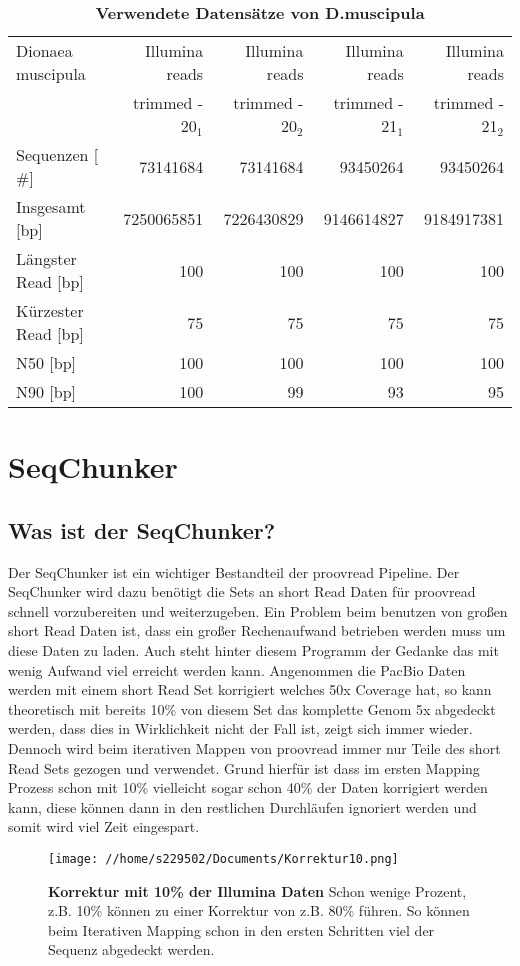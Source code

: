 \documentclass{scrartcl}
\begin{document}
\begin{table}[!ht]
\caption[Verwendete Datensätze von D.muscipula]{\textbf{Verwendete Datensätze von D.muscipula}}
\begin{center}
\begin{tabular}{lrrrr}
Dionaea muscipula & Illumina reads & Illumina reads & Illumina reads & Illumina reads\\
 & trimmed - 20$_{\text{1}}$ & trimmed - 20$_{\text{2}}$ & trimmed - 21$_{\text{1}}$ & trimmed - 21$_{\text{2}}$\\
\hline
Sequenzen        [ \#] & 73141684 & 73141684 & 93450264 & 93450264\\
Insgesamt        [bp] & 7250065851 & 7226430829 & 9146614827 & 9184917381\\
Längster Read    [bp] & 100 & 100 & 100 & 100\\
Kürzester Read   [bp] & 75 & 75 & 75 & 75\\
N50              [bp] & 100 & 100 & 100 & 100\\
N90              [bp] & 100 & 99 & 93 & 95\\
\end{tabular}
\end{center}
\end{table}
\clearpage

\section{SeqChunker}
\label{sec-5}
\subsection{Was ist der SeqChunker?}
\label{sec-5-1}
Der SeqChunker ist ein wichtiger Bestandteil der proovread Pipeline. Der SeqChunker wird 
dazu benötigt die Sets an short Read Daten für proovread schnell vorzubereiten und weiterzugeben.
Ein Problem beim benutzen von großen short Read Daten ist, dass ein großer
Rechenaufwand betrieben werden muss um diese Daten zu laden. Auch steht hinter diesem Programm der 
Gedanke das mit wenig Aufwand viel erreicht werden kann. Angenommen die PacBio Daten werden mit einem
short Read Set korrigiert welches 50x Coverage hat, so kann theoretisch mit bereits 10\% von diesem Set 
das komplette Genom 5x abgedeckt werden, dass dies in Wirklichkeit nicht der Fall ist, zeigt sich immer 
wieder. Dennoch wird beim iterativen Mappen von proovread immer nur Teile des short Read Sets gezogen 
und verwendet. Grund hierfür ist dass im ersten Mapping Prozess schon mit 10\% vielleicht sogar schon 40\% der Daten
korrigiert werden kann, diese können dann in den restlichen Durchläufen ignoriert werden und somit wird viel 
Zeit eingespart.
\begin{figure}
\texttt{[image: //home/s229502/Documents/Korrektur10.png]}
\caption[Korrektur mit 10\% der Illumina Daten]{\textbf{Korrektur mit 10\% der Illumina Daten} Schon wenige Prozent, z.B. 10\% können zu einer Korrektur von z.B. 80\% führen. So können beim Iterativen Mapping schon in den ersten Schritten viel der Sequenz abgedeckt werden.}
\end{figure}
\end{document}
